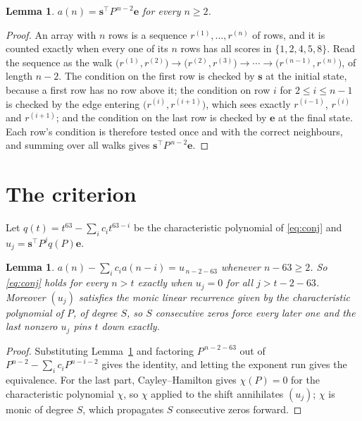 \documentclass[11pt,a4paper]{article}
\theoremstyle{plain}
\newtheorem{lemma}[theorem]{Lemma}
\theoremstyle{definition}
\begin{document}
\begin{lemma}\label{lem:walk}
$a(n)=\mathbf{s}^{\!\top}P^{\,n-2}\mathbf{e}$ for every $n\ge2$.
\end{lemma}

\begin{proof}
An array with $n$ rows is a sequence $r^{(1)},\dots,r^{(n)}$ of rows, and it is counted
exactly when every one of its $n$ rows has all scores in $\{1,2,4,5,8\}$. Read the sequence as the
walk $\bigl(r^{(1)},r^{(2)}\bigr)\to\bigl(r^{(2)},r^{(3)}\bigr)\to\cdots\to
\bigl(r^{(n-1)},r^{(n)}\bigr)$, of length $n-2$. The condition on the first row is
checked by $\mathbf{s}$ at the initial state, because a first row has no row above it; the
condition on row $i$ for $2\le i\le n-1$ is checked by the edge entering
$\bigl(r^{(i)},r^{(i+1)}\bigr)$, which sees exactly $r^{(i-1)}$, $r^{(i)}$ and
$r^{(i+1)}$; and the condition on the last row is checked by $\mathbf{e}$ at the final
state. Each row's condition is therefore tested once and with the correct neighbours, and
summing over all walks gives $\mathbf{s}^{\!\top}P^{\,n-2}\mathbf{e}$.
\end{proof}

\section{The criterion}

Let $q(t)=t^{63}-\sum_i c_i t^{63-i}$ be the characteristic polynomial of
\eqref{eq:conj} and $u_j=\mathbf{s}^{\!\top}P^{j}q(P)\mathbf{e}$.

\begin{lemma}\label{lem:crit}
$a(n)-\sum_i c_i a(n-i)=u_{\,n-2-63}$ whenever $n-63\ge2$. So \eqref{eq:conj}
holds for every $n>t$ exactly when $u_j=0$ for all $j>t-2-63$. Moreover $(u_j)$
satisfies the monic linear recurrence given by the characteristic polynomial of $P$, of
degree $S$, so $S$ consecutive zeros force every later one and the last nonzero $u_j$ pins
$t$ down exactly.
\end{lemma}

\begin{proof}
Substituting Lemma~\ref{lem:walk} and factoring $P^{\,n-2-63}$ out of
$P^{n-2}-\sum_i c_i P^{n-i-2}$ gives the identity, and letting the exponent run gives the
equivalence. For the last part, Cayley--Hamilton gives $\chi(P)=0$ for the characteristic
polynomial $\chi$, so $\chi$ applied to the shift annihilates $(u_j)$; $\chi$ is monic of
degree $S$, which propagates $S$ consecutive zeros forward.
\end{proof}
\end{document}
